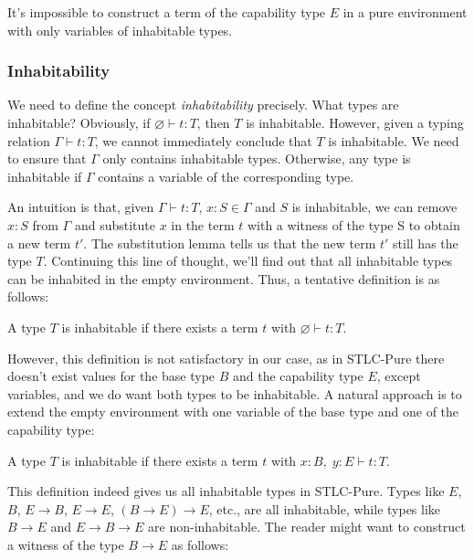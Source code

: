 \begin{definition}
  It's impossible to construct a term of the capability type $E$ in a
  pure environment with only variables of inhabitable types.
\end{definition}

\subsubsection{Inhabitability}

We need to define the concept \emph{inhabitability} precisely. What
types are inhabitable? Obviously, if $\varnothing \vdash t: T$, then
$T$ is inhabitable.  However, given a typing relation
$\Gamma \vdash t: T$, we cannot immediately conclude that $T$ is
inhabitable. We need to ensure that $\Gamma$ only contains inhabitable
types. Otherwise, any type is inhabitable if $\Gamma$ contains a
variable of the corresponding type.

An intuition is that, given $\Gamma \vdash t: T$, $x:S \in \Gamma$ and
$S$ is inhabitable, we can remove $x:S$ from $\Gamma$ and substitute $x$
in the term $t$ with a witness of the type S to obtain a new term
$t'$. The substitution lemma tells us that the new term $t'$ still has
the type $T$. Continuing this line of thought, we'll find out that all
inhabitable types can be inhabited in the empty environment. Thus, a
tentative definition is as follows:

\begin{definition}
  A type $T$ is inhabitable if there exists a term $t$ with
  $\varnothing \vdash t : T$.
\end{definition}

However, this definition is not satisfactory in our case, as in
STLC-Pure there doesn't exist values for the base type $B$ and the
capability type $E$, except variables, and we do want both types to be
inhabitable. A natural approach is to extend the empty environment
with one variable of the base type and one of the capability type:

\begin{definition}
  A type $T$ is inhabitable if there exists a term $t$ with
  $x:B,\; y:E \vdash t : T$.
\end{definition}

This definition indeed gives us all inhabitable types in
STLC-Pure. Types like $E$, $B$, $E \to B$, $E \to E$,
$(B \to E) \to E$, etc., are all inhabitable, while types like
$B \to E$ and $E \to B \to E$ are non-inhabitable. The reader might
want to construct a witness of the type $B \to E$ as follows:

